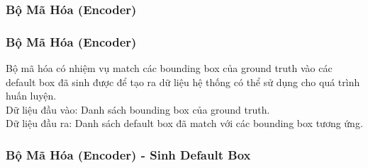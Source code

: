 \documentclass{beamer}
\begin{document}
	
	
	\subsubsection{Bộ Mã Hóa (Encoder)}
	
	\begin{frame}
		\frametitle{Bộ Mã Hóa (Encoder)}
		
		Bộ mã hóa có nhiệm vụ match các bounding box của ground truth vào các default box đã sinh được để tạo ra dữ liệu hệ thống có thể sử dụng cho quá trình huấn luyện.\\
		
		Dữ liệu đầu vào: Danh sách bounding box của ground truth.\\
		
		Dữ liệu đầu ra: Danh sách default box đã match với các bounding box tương ứng.
		
	\end{frame}
	
	\begin{frame}
		\frametitle{Bộ Mã Hóa (Encoder) - Sinh Default Box}
		
	\end{frame}
	
	
\end{document}
